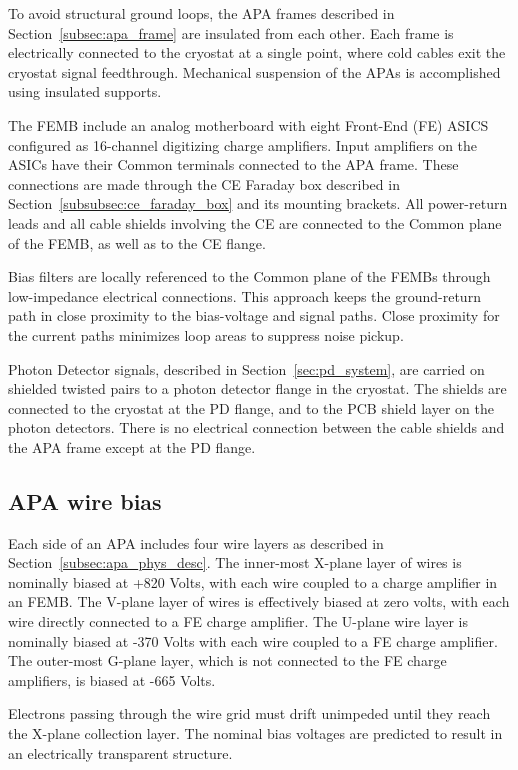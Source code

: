 To avoid structural ground loops, the APA frames described in Section~\ref{subsec:apa_frame} 
are insulated from each other. Each frame is electrically connected to the cryostat at a single 
point, where cold cables exit the cryostat signal feedthrough. Mechanical suspension of the APAs 
is accomplished using insulated supports. 

The FEMB  include an analog motherboard with eight Front-End (FE) ASICS configured as 16-channel 
digitizing charge amplifiers. Input amplifiers on the ASICs have their Common terminals connected 
to the APA frame. These connections are made through the CE Faraday box described in 
Section~\ref{subsubsec:ce_faraday_box} and its mounting brackets. All power-return leads and all cable shields 
involving the CE are connected to the Common plane of the FEMB, as well as to the CE flange.

Bias filters are locally referenced to the Common plane of the FEMBs through low-impedance 
electrical connections. This approach keeps the ground-return path in close proximity to the 
bias-voltage and signal paths. Close proximity for the current paths minimizes loop areas to 
suppress noise pickup.

Photon Detector signals, described in Section~\ref{sec:pd_system}, are carried on shielded 
twisted pairs to a photon detector flange in the cryostat. The shields are connected to the 
cryostat at the PD flange, and to the PCB shield layer on the photon detectors. There is no 
electrical connection between the cable shields and the APA frame except at the PD flange.

%
\subsection{APA wire bias}
\label{subsec:ce_wire_bias}

Each side of an APA includes four wire layers as described in Section~\ref{subsec:apa_phys_desc}. 
The inner-most X-plane layer of wires is nominally biased at +820 Volts, with each wire coupled 
to a charge amplifier in an FEMB. The V-plane layer of wires is effectively biased at zero volts, 
with each wire directly connected to a FE charge amplifier. The U-plane wire layer is nominally 
biased at -370 Volts with each wire coupled to a FE charge amplifier. The outer-most G-plane layer,
which is not connected to the FE charge amplifiers, is biased at -665 Volts.

Electrons passing through the wire grid must drift unimpeded until they reach the X-plane 
collection layer. The nominal bias voltages are predicted to result in an electrically 
transparent structure.

